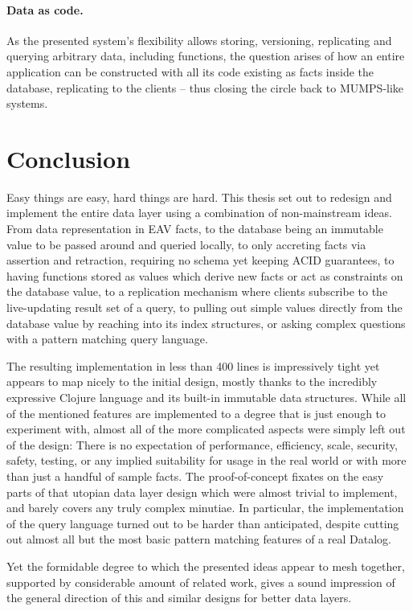 \paragraph{Data as code.} As the presented system's flexibility allows storing, versioning, replicating and querying arbitrary data, including functions, the question arises of how an entire application can be constructed with all its code existing as facts inside the database, replicating to the clients -- thus closing the circle back to MUMPS-like systems.


\cleardoublepage
\section{Conclusion}

Easy things are easy, hard things are hard. This thesis set out to redesign and implement the entire data layer using a combination of non-mainstream ideas. From data representation in EAV facts, to the database being an immutable value to be passed around and queried locally, to only accreting facts via assertion and retraction, requiring no schema yet keeping ACID guarantees, to having functions stored as values which derive new facts or act as constraints on the database value, to a replication mechanism where clients subscribe to the live-updating result set of a query, to pulling out simple values directly from the database value by reaching into its index structures, or asking complex questions with a pattern matching query language.

The resulting implementation in less than 400 lines is impressively tight yet appears to map nicely to the initial design, mostly thanks to the incredibly expressive Clojure language and its built-in immutable data structures. While all of the mentioned features are implemented to a degree that is just enough to experiment with, almost all of the more complicated aspects were simply left out of the design: There is no expectation of performance, efficiency, scale, security, safety, testing, or any implied suitability for usage in the real world or with more than just a handful of sample facts. The proof-of-concept fixates on the easy parts of that utopian data layer design which were almost trivial to implement, and barely covers any truly complex minutiae. In particular, the implementation of the query language turned out to be harder than anticipated, despite cutting out almost all but the most basic pattern matching features of a real Datalog.

Yet the formidable degree to which the presented ideas appear to mesh together, supported by considerable amount of related work, gives a sound impression of the general direction of this and similar designs for better data layers.
